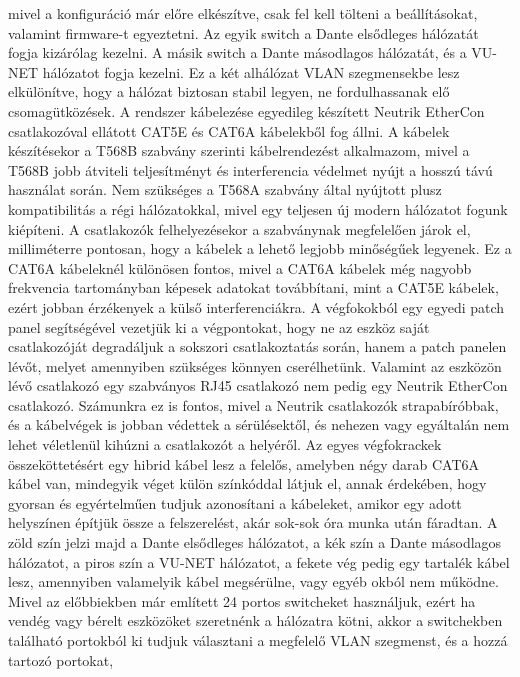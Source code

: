 mivel a konfiguráció már előre elkészítve, csak fel kell tölteni a beállításokat, valamint firmware-t egyeztetni.
Az egyik switch a Dante elsődleges hálózatát fogja kizárólag kezelni.
A másik switch a Dante másodlagos hálózatát, és a VU-NET hálózatot fogja kezelni.
Ez a két alhálózat VLAN szegmensekbe lesz elkülönítve, hogy a hálózat biztosan stabil legyen, ne fordulhassanak elő csomagütközések.
A rendszer kábelezése egyedileg készített Neutrik EtherCon csatlakozóval ellátott CAT5E és CAT6A kábelekből fog állni.
A kábelek készítésekor a T568B szabvány szerinti kábelrendezést alkalmazom, mivel a T568B jobb átviteli
teljesítményt és interferencia védelmet nyújt a hosszú távú használat során.
Nem szükséges a T568A szabvány által nyújtott plusz kompatibilitás a régi hálózatokkal, mivel egy teljesen új 
modern hálózatot fogunk kiépíteni. 
A csatlakozók felhelyezésekor a szabványnak megfelelően járok el, milliméterre pontosan, hogy a kábelek
a lehető legjobb minőségűek legyenek. Ez a CAT6A kábeleknél különösen fontos, mivel a CAT6A kábelek
még nagyobb frekvencia tartományban képesek adatokat továbbítani, mint a CAT5E kábelek,
ezért jobban érzékenyek a külső interferenciákra.
A végfokokból egy egyedi patch panel segítségével vezetjük ki a végpontokat, hogy ne az eszköz saját csatlakozóját
degradáljuk a sokszori csatlakoztatás során, hanem a patch panelen lévőt, melyet amennyiben szükséges könnyen cserélhetünk.
Valamint az eszközön lévő csatlakozó egy szabványos RJ45 csatlakozó nem pedig egy Neutrik EtherCon csatlakozó.
Számunkra ez is fontos, mivel a Neutrik csatlakozók strapabíróbbak, és a kábelvégek is jobban védettek a sérülésektől,
és nehezen vagy egyáltalán nem lehet véletlenül kihúzni a csatlakozót a helyéről.
Az egyes végfokrackek összeköttetésért egy hibrid kábel lesz a felelős, amelyben négy darab CAT6A kábel van,
mindegyik véget külön színkóddal látjuk el, annak érdekében, hogy gyorsan és egyértelműen tudjuk azonosítani a kábeleket,
amikor egy adott helyszínen építjük össze a felszerelést, akár sok-sok óra munka után fáradtan.
A zöld szín jelzi majd a Dante elsődleges hálózatot, a kék szín a Dante másodlagos hálózatot, a piros szín a VU-NET hálózatot,
a fekete vég pedig egy tartalék kábel lesz, amennyiben valamelyik kábel megsérülne, vagy egyéb okból nem működne.
Mivel az előbbiekben már említett 24 portos switcheket használjuk, ezért ha vendég vagy bérelt eszközöket szeretnénk a hálózatra kötni,
akkor a switchekben található portokból ki tudjuk választani a megfelelő VLAN szegmenst, és a hozzá tartozó portokat,
